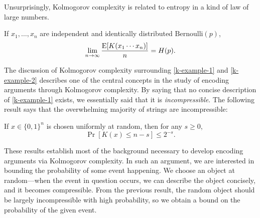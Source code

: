 Unsurprisingly, Kolmogorov complexity is related to entropy in a kind
of law of large numbers.
\begin{thm}
  If $x_1, \ldots, x_n$ are independent and identically distributed
  $\text{Bernoulli}(p)$,
  \[\lim_{n \to \infty} \frac{\operatorname{\mathrm{E}}[K(x_1 \cdots x_n)]}{n} =
  H(p).\]
\end{thm}

The discussion of Kolmogorov complexity surrounding
\eqref{k-example-1} and \eqref{k-example-2} describes one of the
central concepts in the study of encoding arguments through Kolmogorov
complexity. By saying that no concise description of
\eqref{k-example-1} exists, we essentially said that it is
\emph{incompressible}. The following result says that the overwhelming
majority of strings are incompressible:
\begin{thm}
  If $x \in \{0, 1\}^n$ is chosen uniformly at random, then for any
  $s \geq 0$,
  \[\Pr[K(x) \leq n - s] \leq 2^{-s}.\]
\end{thm}

These results establish most of the background necessary to develop
encoding arguments via Kolmogorov complexity. In such an argument, we
are interested in bounding the probability of some event happening. We
choose an object at random---when the event in question occurs, we can
describe the object concisely, and it becomes compressible. From the
previous result, the random object should be largely incompressible
with high probability, so we obtain a bound on the probability of the
given event.

